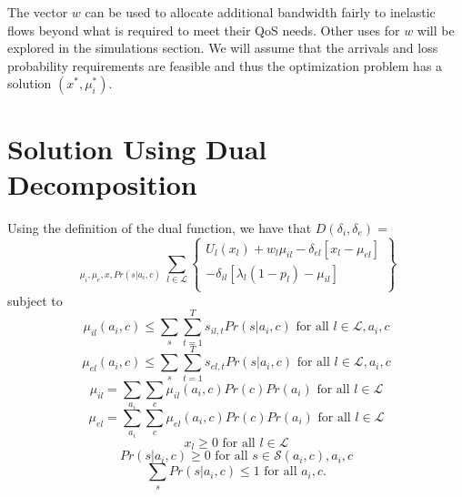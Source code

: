 \documentclass[conference]{IEEEtran}
\begin{document}
The vector $w$ can be used to allocate additional bandwidth fairly to inelastic flows beyond what is required to meet their QoS needs. Other uses for $w$ will be explored in the simulations section. We will assume that the arrivals and loss probability requirements are feasible and thus the optimization problem has a solution $(x^*, \mu_i^*)$.

\section{Solution Using Dual Decomposition}
\label{decomposition_kc}

Using the definition of the dual function\cite{Luenberger03}, we have that $D(\delta_i, \delta_e)=$
\begin{equation*}
	\mathop{ \max\limits_{ \mu_{i}(a_i,c), \mu_{e}(a_i,c), } }\limits_{ \mu_{i}, \mu_{e}, x, Pr(s | a_i, c) } \sum\limits_{l \in \mathcal{L}} \left\{ \begin{array}{l} U_l(x_l) + w_l \mu_{il} - \delta_{el} [x_l - \mu_{el}] \\ - \delta_{il} [\lambda_l(1-p_l) - \mu_{il}] \\ \end{array} \right\}
\end{equation*}
subject to
\begin{equation*}
 \mu_{il}(a_i,c) \leq \sum\limits_{s} \sum_{t=1}^{T} s_{il,t} Pr(s | a_i, c) \mbox{ for all } l \in \mathcal{L}, a_i, c
\end{equation*}
\begin{equation*}
 \mu_{el}(a_i,c) \leq \sum\limits_{s} \sum_{t=1}^{T} s_{el,t} Pr(s | a_i, c) \mbox{ for all } l \in \mathcal{L}, a_i, c
\end{equation*}
\begin{equation*}
	\mu_{il} = \sum\limits_{a_i} \sum\limits_{c} \mu_{il}(a_i,c) Pr(c) Pr(a_i) \mbox{ for all } l \in \mathcal{L}
\end{equation*}
\begin{equation*}
	\mu_{el} = \sum\limits_{a_i} \sum\limits_{c} \mu_{el}(a_i,c) Pr(c) Pr(a_i) \mbox{ for all } l \in \mathcal{L}
\end{equation*}
\begin{equation*}
	x_l \geq 0 \mbox{ for all } l \in \mathcal{L}
\end{equation*}
\begin{equation*}
	Pr(s | a_i, c) \geq 0 \mbox{ for all } s \in \mathcal{S}(a_i, c), a_i, c
\end{equation*}
\begin{equation*}
	\sum_{s} Pr(s | a_i, c) \leq 1 \mbox{ for all } a_i, c.
\end{equation*}
\end{document}
